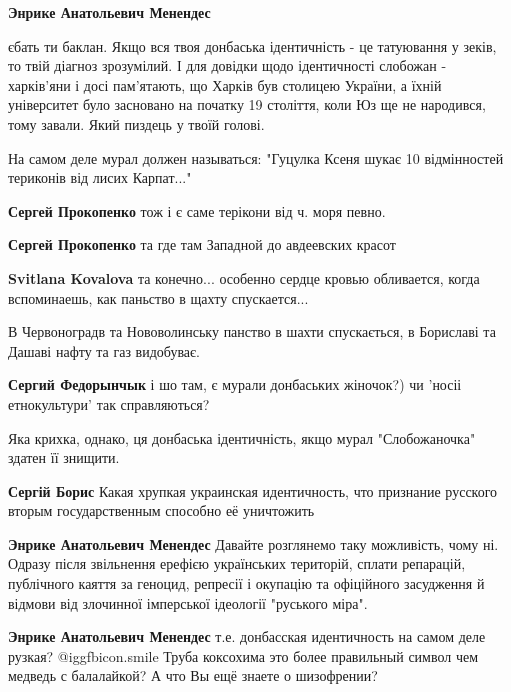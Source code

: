 \begin{itemize}
\begin{itemize}
\textbf{Энрике Анатольевич Менендес} 

єбать ти баклан. Якщо вся твоя донбаська ідентичність - це татуювання у зеків,
то твій діагноз зрозумілий. І для довідки щодо ідентичності слобожан -
харків'яни і досі пам'ятають, що Харків був столицею України, а їхній
університет було засновано на початку 19 століття, коли Юз ще не народився,
тому завали. Який пиздець у твоїй голові.

\end{itemize} %

На самом деле мурал должен называться: "Гуцулка Ксеня шукає 10 відмінностей териконів від лисих Карпат..."

\begin{itemize} %
\textbf{Сергей Прокопенко} тож і є саме терікони від ч. моря певно.

\textbf{Сергей Прокопенко} та где там Западной до авдеевских красот

\textbf{Svitlana Kovalova} та конечно... особенно сердце кровью обливается, когда вспоминаешь, как паньство в щахту спускается...

В Червоноградв та Нововолинську панство в шахти спускається, в Бориславі та Дашаві нафту та газ видобуває.

\textbf{Сергий Федорынчык} і шо там, є мурали донбаських жіночок?) чи 'носіі етнокультури' так справляються?
\end{itemize} %


Яка крихка, однако, ця донбаська ідентичність, якщо мурал "Слобожаночка" здатен
її знищити.

\begin{itemize} %
\textbf{Сергій Борис} Какая хрупкая украинская идентичность, что признание русского вторым государственным способно её уничтожить

\textbf{Энрике Анатольевич Менендес} Давайте розглянемо таку можливість, чому ні. Одразу після звільнення ерефією українських територій, сплати репарацій, публічного каяття за геноцид, репресії і окупацію та офіційного засудження й відмови від злочинної імперської ідеології "руського міра".

\textbf{Энрике Анатольевич Менендес} т.е. донбасская идентичность на самом деле рузкая?  @igg{fbicon.smile}  Труба коксохима это более правильный символ чем медведь с балалайкой? А что Вы ещё знаете о шизофрении?


\end{itemize}
\end{itemize}
